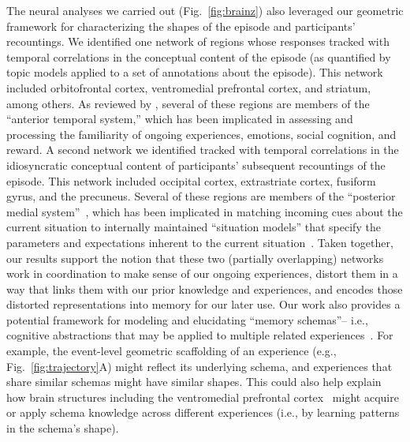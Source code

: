\documentclass[10pt]{article}
\begin{document}
The neural analyses we carried out (Fig.~\ref{fig:brainz}) also leveraged our geometric framework for characterizing the shapes of the episode and participants' recountings.  We identified one network of regions whose responses tracked with temporal correlations in the conceptual content of the episode (as quantified by topic models applied to a set of annotations about the episode).  This network included orbitofrontal cortex, ventromedial prefrontal cortex, and striatum, among others.  As reviewed by \cite{RangRitc12}, several of these regions are members of the ``anterior temporal system,'' which has been implicated in assessing and processing the familiarity of ongoing experiences, emotions, social cognition, and reward.  A second network we identified tracked with temporal correlations in the idiosyncratic conceptual content of participants' subsequent recountings of the episode.  This network included occipital cortex, extrastriate cortex, fusiform gyrus, and the precuneus.  Several of these regions are members of the ``posterior medial system''~\citep{RangRitc12}, which has been implicated in matching incoming cues about the current situation to internally maintained ``situation models'' that specify the parameters and expectations inherent to the current situation~\citep[also see][]{ZackEtal07, ZwaaRadv98}.  Taken together, our results support the notion that these two (partially overlapping) networks work in coordination to make sense of our ongoing experiences, distort them in a way that links them with our prior knowledge and experiences, and encodes those distorted representations into memory for our later use.  Our work also provides a potential framework for modeling and elucidating ``memory schemas''-- i.e., cognitive abstractions that may be applied to multiple related experiences~\citep[e.g.,][]{GilbMarl17, BaldEtal18}.  For example, the event-level geometric scaffolding of an experience (e.g., Fig.~\ref{fig:trajectory}A) might reflect its underlying schema, and experiences that share similar schemas might have similar shapes.  This could also help explain how brain structures including the ventromedial prefrontal cortex~\citep[Fig.~\ref{fig:brainz}; also see][]{GilbMarl17} might acquire or apply schema knowledge across different experiences (i.e., by learning patterns in the schema's shape).
\end{document}
